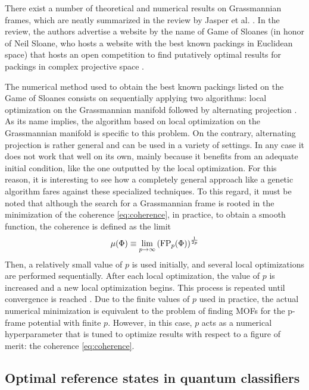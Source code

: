 \documentclass[%
superscriptaddress,
amsmath,amssymb,
 aps,
pra,
floatfix,
]{revtex4-2}
\begin{document}
There exist a number of theoretical and numerical results on Grassmannian frames, which are neatly summarized in the review by Jasper et al. \cite{jasper2019game}. In the review, the authors advertise a website by the name of Game of Sloanes (in honor of Neil Sloane, who hosts a website with the best known packings in Euclidean space) that hosts an open competition to find putatively optimal results for packings in complex projective space \cite{gameofsloanes}.  

The numerical method used to obtain the best known packings listed on the Game of Sloanes consists on sequentially applying two algorithms: local optimization on the Grassmannian manifold \cite{edelman1998geometry, medra2014flexible} followed by alternating projection \cite{tropp2005designing}. As its name implies, the algorithm based on local optimization on the Grassmannian manifold is specific to this problem. On the contrary, alternating projection is rather general and can be used in a variety of settings. In any case it does not work that well on its own, mainly because it benefits from an adequate initial condition, like the one outputted by the local optimization. For this reason, it is interesting to see how a completely general approach like a genetic algorithm fares against these specialized techniques. To this regard, it must be noted that although the search for a Grassmannian frame is rooted in the minimization of the coherence \eqref{eq:coherence}, in practice, to obtain a smooth function, the coherence is defined as the limit 
%
\begin{equation}
    \mu (\Phi) \equiv \lim_{p \to \infty} \left( {\rm FP}_p(\Phi) \right)^{\frac{1}{2p}}
    \label{eq:smoothcoherence}
\end{equation}
%
Then, a relatively small value of $p$ is used initially, and several local optimizations are performed sequentially. After each local optimization, the value of $p$ is increased and a new local optimization begins. This process is repeated until convergence is reached \cite{medra2014flexible}. Due to the finite values of $p$ used in practice, the actual numerical minimization is equivalent to the problem of finding MOFs for the p-frame potential with finite $p$. However, in this case, $p$ acts as a numerical hyperparameter that is tuned to optimize results with respect to a figure of merit: the coherence \eqref{eq:coherence}. 


\subsection{Optimal reference states in quantum classifiers}
\label{quantumclassifier}
\end{document}
